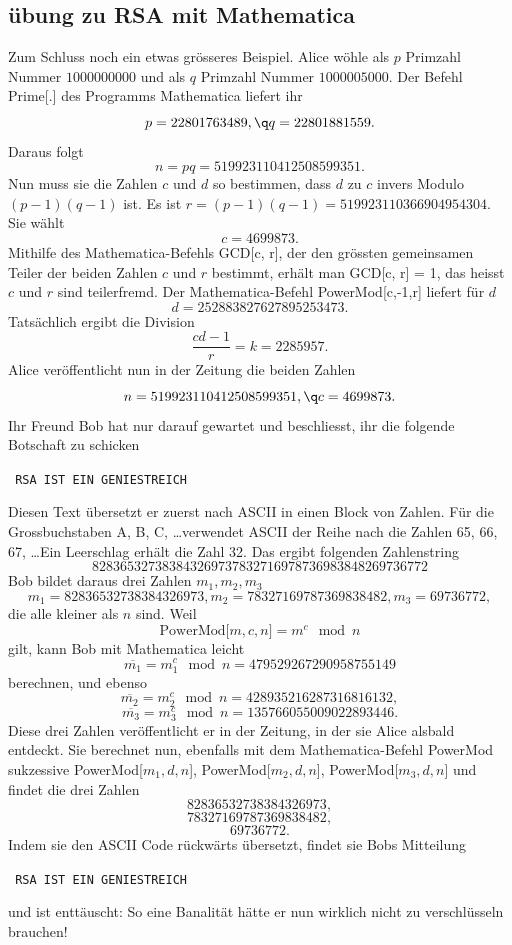 \documentclass[%
11pt,%
twoside,%
titlepage,%
german,%
headsepline%
]{scrartcl}
\begin{document}
\subsection{übung zu RSA mit Mathematica}
Zum
Schluss noch ein etwas grösseres Beispiel. Alice wöhle als $p$ Primzahl Nummer $1000000000$ und als $q$ Primzahl Nummer $1000005000$. Der Befehl Prime[.] des Programms Mathematica liefert ihr
$$p = 22801763489,\q	q = 22801881559.$$
Daraus folgt
$$n = pq = 519923110412508599351.$$
Nun muss sie die Zahlen $c$ und $d$ so bestimmen, dass $d$ zu $c$ invers Modulo $(p-1)(q-1)$ ist. Es ist
$r = (p-1)(q-1) = 519923110366904954304$. Sie wählt
$$c = 4699873.$$
Mithilfe des Mathematica-Befehls GCD[c, r], der den gr\"ossten gemeinsamen Teiler der beiden Zahlen $c$ und $r$ bestimmt, erhält man GCD[c, r] = 1, das heisst $c$ und $r$ sind teilerfremd. Der Mathematica-Befehl PowerMod[c,-1,r] liefert für $d$
$$d = 252883827627895253473.$$
Tatsächlich ergibt die Division
$$\frac{cd - 1}{r} = k = 2285957.$$
Alice ver\"offentlicht nun in der Zeitung die beiden Zahlen
$$n = 519923110412508599351,\q	c = 4699873.$$
Ihr Freund Bob hat nur darauf gewartet und beschliesst, ihr die folgende Botschaft zu schicken
\begin{center}
\texttt{
RSA IST EIN GENIESTREICH
}
\end{center}
Diesen Text übersetzt er zuerst nach ASCII in einen Block von Zahlen. Für die Grossbuchstaben A, B, C, \dots verwendet ASCII der Reihe nach die Zahlen 65, 66, 67, \dots Ein Leerschlag erhält die Zahl 32. Das ergibt folgenden Zahlenstring
$$82 83 65 32 73 83 84 32 69 73 78 32 71 69 78 73 69 83 84 82 69 73 67 72$$
Bob bildet daraus drei Zahlen $m_1, m_2, m_3$
$$m_1 = 82836532738384326973, m_2 = 78327169787369838482, m_3 = 69736772,$$
die alle kleiner als $n$ sind. Weil
$$\text{PowerMod[$m,c,n$]} = m^c\mod n$$
gilt, kann Bob mit Mathematica leicht
$$\overline{m_1} = m_1^c\mod n = 479529267290958755149$$
berechnen, und ebenso
$$\overline{m_2} = m_2^c\mod n = 428935216287316816132,$$
$$\overline{m_3} = m_3^c\mod n = 135766055009022893446.$$
Diese drei Zahlen ver\"offentlicht er in der Zeitung, in der sie Alice alsbald entdeckt. Sie berechnet nun, ebenfalls mit dem Mathematica-Befehl PowerMod sukzessive PowerMod[$m_1,d,n$], 
PowerMod[$m_2,d,n$], PowerMod[$m_3,d,n$] und findet die drei Zahlen
$$82836532738384326973,$$
$$78327169787369838482,$$
$$69736772.$$
Indem sie den ASCII Code rückwärts übersetzt, findet sie Bobs Mitteilung
\begin{center}
\texttt{
RSA IST EIN GENIESTREICH
}
\end{center}
und ist enttäuscht: So eine Banalität hätte er nun wirklich nicht zu verschlüsseln brauchen!
\end{document}
